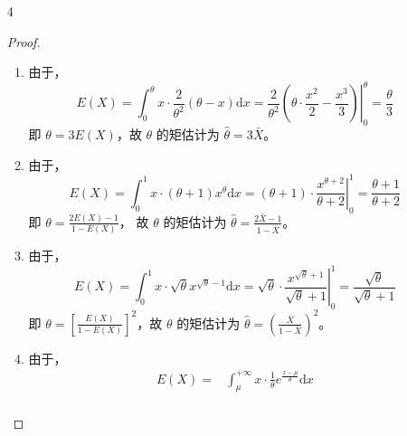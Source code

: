 \documentclass[normal,founder,mtpro2,cn]{elegantnote}
\begin{document}
\begin{enumerate}
\begin{proof}
\begin{enumerate}
\begin{equation*}
\begin{aligned}
                          \end{aligned}
                      \end{equation*}
                      即 $\theta=\frac{2}{E(X)}$，故 $\theta$ 的矩估计为 $\hat{\theta}=\frac{2}{\bar{X}}$。
            \end{enumerate}
        \end{proof}
    \item[4]
        \begin{proof}
            \begin{enumerate}
                \item
                      由于，
                      \begin{equation*}
                          E(X)=\int_{0}^{\theta}x\cdot\frac{2}{\theta^{2}}(\theta-x)\mathrm{d}x=\left.\frac{2}{\theta^{2}}\left(\theta\cdot\frac{x^{2}}{2}-\frac{x^{3}}{3}\right)\right|_{0}^{\theta}=\frac{\theta}{3}
                      \end{equation*}
                      即 $\theta=3E(X)$，故 $\theta$ 的矩估计为 $\hat{\theta}=3\bar{X}$。
                \item
                      由于，
                      \begin{equation*}
                          E(X)=\int_{0}^{1}x\cdot(\theta+1)x^{\theta}\mathrm{d}x=\left.(\theta+1)\cdot\frac{x^{\theta+2}}{\theta+2}\right|_{0}^{1}=\frac{\theta+1}{\theta+2}
                      \end{equation*}
                      即 $\theta=\frac{2E(X)-1}{1-E(X)}$，
                      故 $\theta$ 的矩估计为 $\hat{\theta}=\frac{2\bar{X}-1}{1-\bar{X}}$。
                \item
                      由于，
                      \begin{equation*}
                          E(X)=\int_{0}^{1}x\cdot\sqrt{\theta}x^{\sqrt{\theta}-1}\mathrm{d}x=\left.\sqrt{\theta}\cdot\frac{x^{\sqrt{\theta}+1}}{\sqrt{\theta}+1}\right|_{0} ^{1}=\frac{\sqrt{\theta}}{\sqrt{\theta}+1}
                      \end{equation*}
                      即 $\theta=\left[\frac{E(X)}{1-E(X)}\right]^{2}$，故 $\theta$ 的矩估计为 $\hat{\theta}=\left(\frac{\bar{X}}{1-\bar{X}}\right)^{2}$。
                \item
                      由于，
                      \begin{equation*}
                          \begin{aligned}
                              E(X)= & \int_{\mu}^{+\infty}x\cdot\frac{1}{\theta}e^{\frac{x-\mu}{\theta}}\mathrm{d}x                                   \\

\end{aligned}
\end{equation*}
\end{enumerate}
\end{proof}
\end{enumerate}
\end{document}
